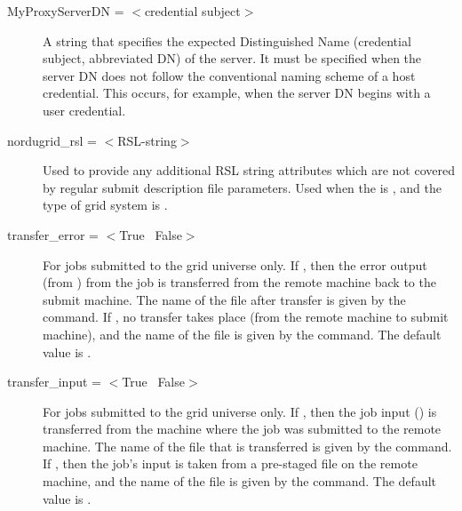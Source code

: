 \begin{description}

\label{condor-submit-MyProxyServerDN}
\item[MyProxyServerDN = $<$credential subject$>$]
A string that specifies the expected Distinguished Name (credential subject,
abbreviated DN)
of the  server.
It must be specified when the  server
DN does not follow the
conventional naming scheme of a host credential.
This occurs, for
example, when the   server DN begins with a user credential.



\label{condor-submit-nordugrid-rsl}
\item[nordugrid\_rsl = $<$RSL-string$>$]
Used to provide any additional RSL
string attributes which are not covered by regular submit description
file parameters. Used when the  is ,
and the type of grid system is .


\label{condor-submit-transfer-error}
\item[transfer\_error = $<$True \Bar\ False$>$]
For jobs submitted to the grid universe only.
If , then the error output (from ) from the job
is transferred from the remote machine back to the submit machine.
The name of the file after transfer is given
by the  command.
If , no transfer takes place (from the remote machine
to submit machine),
and the name of the file is given
by the  command.
The default value is .

\label{condor-submit-transfer-input}
\item[transfer\_input = $<$True \Bar\ False$>$]
For jobs submitted to the grid universe only.
If , then the job input () is transferred
from the machine where the job was submitted to the remote machine.
The name of the file that is transferred is given by the
 command.
If , then the job's input is taken from a pre-staged
file on the remote machine, and
the name of the file is given by the  command.
The default value is .


\end{description}
